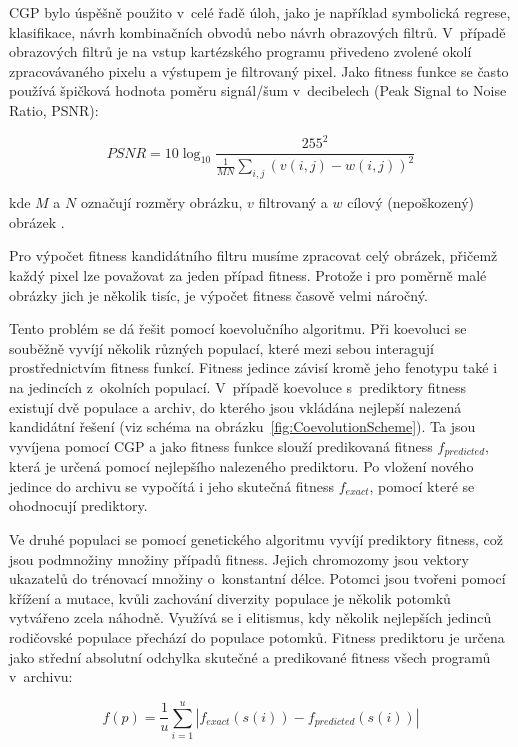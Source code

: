 \documentclass[czech]{ExcelAtFIT} %
\begin{document}
CGP bylo úspěšně použito v~celé řadě úloh, jako je například symbolická regrese, klasifikace, návrh kombinačních obvodů nebo návrh obrazových filtrů. V~případě obrazových filtrů je na vstup kartézského programu přivedeno zvolené okolí zpracovávaného pixelu a výstupem je filtro\-va\-ný pixel. Jako fitness funkce se často používá špičková hodnota poměru signál/šum v~decibelech (Peak Signal to Noise Ratio, PSNR):

\begin{equation}
    \label{eq:PSNR}
    \mathit{PSNR} = 10 \log_{10} \frac{255^2}{\frac{1}{MN} \sum\limits_{i,j} \left( v\left( i, j \right) - w\left( i, j \right)  \right)^2 }
\end{equation}

\noindent{}kde $M$ a $N$ označují rozměry obrázku, $v$ filtrovaný a $w$ cílový (nepoškozený) obrázek \cite{ZelenaIF}.

Pro výpočet fitness kandidátního filtru musíme zpracovat celý obrázek, přičemž každý pixel lze považovat za jeden případ fitness. Protože i pro po\-měrně malé obrázky jich je několik tisíc, je výpočet fitness časově velmi náročný.

Tento problém se dá řešit pomocí koevolučního algoritmu. Při koevoluci se souběžně vyvíjí několik různých populací, které mezi sebou interagují prostřednictvím fitness funkcí. Fitness jedince závisí kromě jeho fenotypu také i na jedincích z~okolních populací. V~případě koevoluce s~prediktory fitness existují dvě populace a archiv, do kterého jsou vkládána nej\-lep\-ší nalezená kandidátní řešení (viz schéma na obrázku~\ref{fig:CoevolutionScheme}). Ta jsou vyvíjena pomocí CGP a jako fitness funkce slouží predikovaná fitness $f_{\mathit{predicted}}$, která je určená pomocí nej\-lep\-šího nalezeného prediktoru. Po vložení nového jedince do archivu se vypočítá i jeho skutečná fitness $f_{\mathit{exact}}$, pomocí které se ohodnocují prediktory.

Ve druhé populaci se pomocí genetického algoritmu vyvíjí prediktory fitness, což jsou pod\-mno\-žiny mno\-žiny případů fitness. Jejich chromozomy jsou vek\-tory ukazatelů do trénovací množiny o~konstantní délce. Potomci jsou tvořeni pomocí křížení a mutace, kvůli zachování diverzity populace je ně\-ko\-lik potomků vytvářeno zcela náhodně. Využívá se i eli\-tis\-mus, kdy několik nejlepších jedinců rodičovské populace přechází do populace potomků. Fitness prediktoru je určena jako střední absolutní odchylka skutečné a predikované fitness všech programů v~archivu:

\begin{equation}
    \label{eq:fitnessPredictor}
    f \left( p \right) = \frac{1}{u} \sum\limits_{i=1}^{u} \left| f_{\mathit{exact}} \left( s\left( i \right) \right) - f_{\mathit{predicted}} \left( s\left( i \right) \right) \right|
\end{equation}
\end{document}
